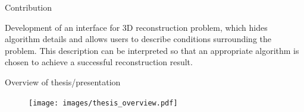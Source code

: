 \documentclass[10pt]{beamer}
\begin{document}
\begin{frame}{Contribution}

Development of an interface for 3D reconstruction problem, which hides algorithm details and allows users to describe conditions surrounding the problem. This description can be interpreted so that an appropriate algorithm is chosen to achieve a successful reconstruction result.


\end{frame}

\begin{frame}{Overview of thesis/presentation}

\begin{figure}
\centering
\texttt{[image: images/thesis\_overview.pdf]}
\end{figure}

\end{frame}

\end{document}
